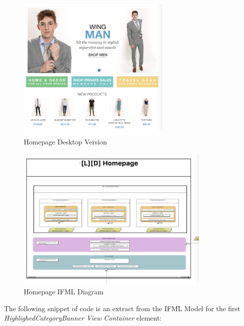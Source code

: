 \vspace{0.5cm}
\begin{figure}[H]
  \centering
    \includegraphics[height=7cm]{images/diagrams/before/desktop-homepage.png}
  \caption{Homepage Desktop Version}
  \label{fig:desktop-before-homepage}
\end{figure}
\vspace{0.5cm}

\begin{figure}[H]
  \centering
    \includegraphics[height=7cm]{images/diagrams/before/ifml-homepage.png}
  \caption{Homepage IFML Diagram}
  \label{fig:ifml-before-homepage}
\end{figure}
\vspace{0.5cm}

\newpage
The following snippet of code is an extract from the IFML Model for the first \textit{HighlighedCategoryBanner View Container} element: 

